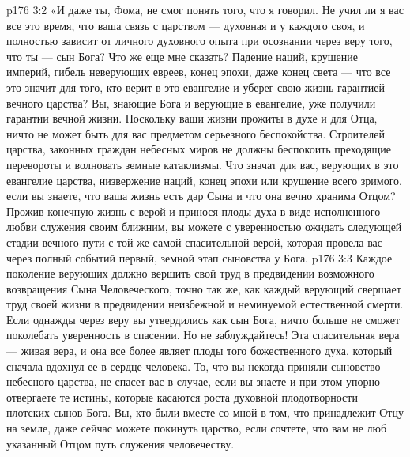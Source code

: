 \vs p176 3:2 \pc «И даже ты, Фома, не смог понять того, что я говорил. Не учил ли я вас все это время, что ваша связь с царством --- духовная и у каждого своя, и полностью зависит от личного духовного опыта при осознании через веру того, что ты --- сын Бога? Что же еще мне сказать? Падение наций, крушение империй, гибель неверующих евреев, конец эпохи, даже конец света --- что все это значит для того, кто верит в это евангелие и уберег свою жизнь гарантией вечного царства? Вы, знающие Бога и верующие в евангелие, уже получили гарантии вечной жизни. Поскольку ваши жизни прожиты в духе и для Отца, ничто не может быть для вас предметом серьезного беспокойства. Строителей царства, законных граждан небесных миров не должны беспокоить преходящие перевороты и волновать земные катаклизмы. Что значат для вас, верующих в это евангелие царства, низвержение наций, конец эпохи или крушение всего зримого, если вы знаете, что ваша жизнь есть дар Сына и что она вечно хранима Отцом? Прожив конечную жизнь с верой и принося плоды духа в виде исполненного любви служения своим ближним, вы можете с уверенностью ожидать следующей стадии вечного пути с той же самой спасительной верой, которая провела вас через полный событий первый, земной этап сыновства у Бога.
\vs p176 3:3 Каждое поколение верующих должно вершить свой труд в предвидении возможного возвращения Сына Человеческого, точно так же, как каждый верующий свершает труд своей жизни в предвидении неизбежной и неминуемой естественной смерти. Если однажды через веру вы утвердились как сын Бога, ничто больше не сможет поколебать уверенность в спасении. Но не заблуждайтесь! Эта спасительная вера --- живая вера, и она все более являет плоды того божественного духа, который сначала вдохнул ее в сердце человека. То, что вы некогда приняли сыновство небесного царства, не спасет вас в случае, если вы знаете и при этом упорно отвергаете те истины, которые касаются роста духовной плодотворности плотских сынов Бога. Вы, кто были вместе со мной в том, что принадлежит Отцу на земле, даже сейчас можете покинуть царство, если сочтете, что вам не люб указанный Отцом путь служения человечеству.
